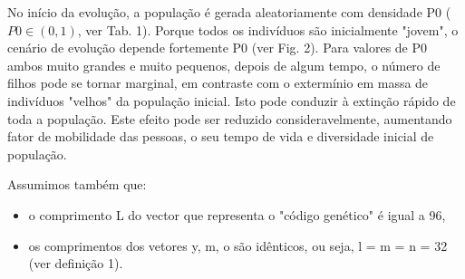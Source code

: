 \documentclass{article}
\begin{document}
No início da evolução, a população é gerada aleatoriamente com densidade P0 ($P0 \in (0,1)$, ver Tab. 1). Porque todos os indivíduos são inicialmente "jovem", o cenário de evolução depende fortemente P0 (ver Fig. 2). Para valores de P0 ambos muito grandes e muito pequenos, depois de algum tempo, o número de filhos pode se tornar marginal, em contraste com o extermínio em massa de indivíduos "velhos" da população inicial. Isto pode conduzir à extinção rápido de toda a população. Este efeito pode ser reduzido consideravelmente, aumentando fator de mobilidade das pessoas, o seu tempo de vida e diversidade inicial de população.


Assumimos também que:

\begin{itemize}
\item o comprimento L do vector que representa o "código genético" é igual a 96,
\item os comprimentos dos vetores y, m, o são idênticos, ou seja, l = m = n = 32 (ver definição 1).
\end{itemize}

\end{document}
